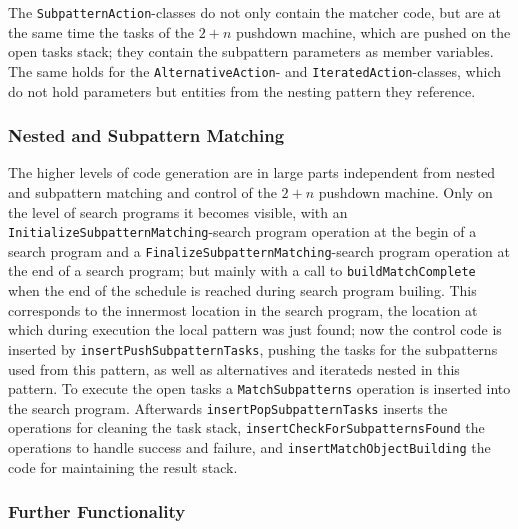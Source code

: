 The \texttt{Subpattern\-Action}-classes do not only contain the matcher code, 
but are at the same time the tasks of the $2+n$ pushdown machine, which are pushed on the open tasks stack;
they contain the subpattern parameters as member variables.
The same holds for the \texttt{Alternative\-Action}- and \texttt{Iterated\-Action}-classes,
which do not hold parameters but entities from the nesting pattern they reference. 


\subsubsection*{Nested and Subpattern Matching}

The higher levels of code generation are in large parts independent from nested and subpattern matching and control of the $2+n$ pushdown machine.
Only on the level of search programs it becomes visible,  
with an \texttt{Initialize\-Subpattern\-Matching}-search program operation at the begin of a search program
and a \texttt{Finalize\-Subpattern\-Matching}-search program operation at the end of a search program;
but mainly with a call to \texttt{build\-Match\-Complete} when the end of the schedule is reached during search program builing.
This corresponds to the innermost location in the search program,
the location at which during execution the local pattern was just found;
now the control code is inserted by \texttt{insert\-Push\-Subpattern\-Tasks},
pushing the tasks for the subpatterns used from this pattern, as well as alternatives and iterateds nested in this pattern.
To execute the open tasks a \texttt{Match\-Subpatterns} operation is inserted into the search program. 
Afterwards \texttt{insert\-Pop\-Subpattern\-Tasks} inserts the operations for cleaning the task stack,
\texttt{insert\-Check\-For\-Subpatterns\-Found} the operations to handle success and failure, 
and \texttt{insert\-Match\-Object\-Building} the code for maintaining the result stack.


\subsubsection*{Further Functionality}


